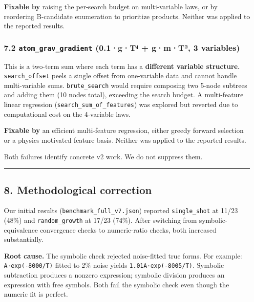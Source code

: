 \documentclass[
]{article}
\begin{document}
\textbf{Fixable by} raising the per-search budget on multi-variable
laws, or by reordering B-candidate enumeration to prioritize products.
Neither was applied to the reported results.

\subsubsection{\texorpdfstring{7.2 \texttt{atom\_grav\_gradient}
(0.1·g·T⁴ + g·m·T², 3
variables)}{7.2 atom\_grav\_gradient (0.1·g·T⁴ + g·m·T², 3 variables)}}\label{atom_grav_gradient-0.1gtux2074-gmtuxb2-3-variables}

This is a two-term sum where each term has a \textbf{different variable
structure}. \texttt{search\_offset} peels a single offset from
one-variable data and cannot handle multi-variable sums.
\texttt{brute\_search} would require composing two 5-node subtrees and
adding them (10 nodes total), exceeding the search budget. A
multi-feature linear regression (\texttt{search\_sum\_of\_features}) was
explored but reverted due to computational cost on the 4-variable laws.

\textbf{Fixable by} an efficient multi-feature regression, either greedy
forward selection or a physics-motivated feature basis. Neither was
applied to the reported results.

Both failures identify concrete v2 work. We do not suppress them.

\begin{center}\rule{0.5\linewidth}{0.5pt}\end{center}

\subsection{8. Methodological
correction}\label{methodological-correction}

Our initial results (\texttt{benchmark\_full\_v7.json}) reported
\texttt{single\_shot} at 11/23 (48\%) and \texttt{random\_growth} at
17/23 (74\%). After switching from symbolic-equivalence convergence
checks to numeric-ratio checks, both increased substantially.

\textbf{Root cause.} The symbolic check rejected noise-fitted true
forms. For example: \texttt{A·exp(-8000/T)} fitted to 2\% noise yields
\texttt{1.01A·exp(-8005/T)}. Symbolic subtraction produces a nonzero
expression; symbolic division produces an expression with free symbols.
Both fail the symbolic check even though the numeric fit is perfect.
\end{document}
